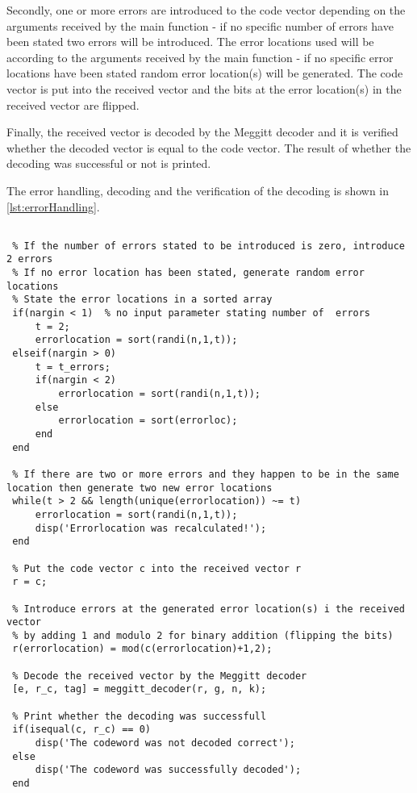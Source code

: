 \documentclass[Main]{subfiles}
\begin{document}
Secondly, one or more errors are introduced to the code vector depending on the arguments received by the main function - if no specific number of errors have been stated two errors will be introduced. 
The error locations used will be according to the arguments received by the main function - if no specific error locations have been stated random error location(s) will be generated. 
The code vector is put into the received vector and the bits at the error location(s) in the received vector are flipped.

Finally, the received vector is decoded by the Meggitt decoder and it is verified whether the decoded vector is equal to the code vector. 
The result of whether the decoding was successful or not is printed.

The error handling, decoding and the verification of the decoding is shown in \codeTitle \ref{lst:errorHandling}.

\begin{lstlisting}[caption=Error Handling and Decoding, style=Code-Matlab, label=lst:errorHandling]
 % Transmit the code vector through an artificial communication channel, i.e. introduce at least one error to the code vector:

 % If the number of errors stated to be introduced is zero, introduce 2 errors
 % If no error location has been stated, generate random error locations
 % State the error locations in a sorted array
 if(nargin < 1)  % no input parameter stating number of  errors
     t = 2;
     errorlocation = sort(randi(n,1,t));
 elseif(nargin > 0)
     t = t_errors;
     if(nargin < 2)
         errorlocation = sort(randi(n,1,t));
     else
         errorlocation = sort(errorloc);
     end
 end

 % If there are two or more errors and they happen to be in the same location then generate two new error locations
 while(t > 2 && length(unique(errorlocation)) ~= t)
     errorlocation = sort(randi(n,1,t));
     disp('Errorlocation was recalculated!');
 end

 % Put the code vector c into the received vector r
 r = c;

 % Introduce errors at the generated error location(s) i the received vector
 % by adding 1 and modulo 2 for binary addition (flipping the bits)
 r(errorlocation) = mod(c(errorlocation)+1,2);

 % Decode the received vector by the Meggitt decoder
 [e, r_c, tag] = meggitt_decoder(r, g, n, k);

 % Print whether the decoding was successfull 
 if(isequal(c, r_c) == 0)
     disp('The codeword was not decoded correct');
 else
     disp('The codeword was successfully decoded');
 end
\end{lstlisting}
\end{document}

